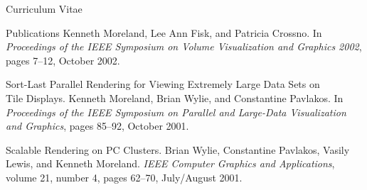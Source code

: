 \documentclass{article}
\begin{document}
\begin{cv}{Curriculum Vitae}
\begin{cvlist}{Publications}
      Kenneth Moreland, Lee Ann Fisk, and Patricia Crossno.  In
      \emph{Proceedings of the IEEE Symposium on Volume Visualization and
        Graphics 2002}, pages 7--12, October 2002.
    \item[Sort-Last Parallel Rendering for Viewing Extremely Large Data
      Sets on]~\\ Tile Displays. Kenneth Moreland, Brian Wylie, and
      Constantine Pavlakos.  In \emph{Proceedings of the IEEE Symposium on
        Parallel and Large-Data Visualization and Graphics}, pages 85--92,
      October 2001.
    \item[Scalable Rendering on PC Clusters.] Brian Wylie, Constantine
      Pavlakos, Vasily Lewis, and Kenneth Moreland.  \emph{IEEE Computer
        Graphics and Applications}, volume 21, number 4, pages 62--70,
      July/August 2001.
    \end{cvlist}


\end{cv}
\end{document}
